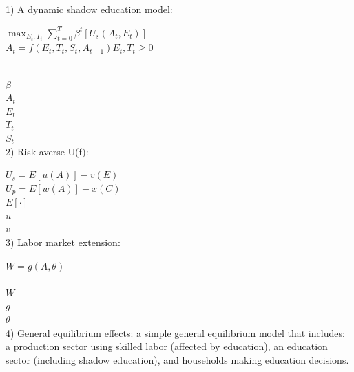 \documentclass[12pt,a4paper,onecolumn]{article}
\numberwithin{equation}{section}
\begin{document}
1) A dynamic shadow education model:

$\max_{E_t, T_t} \sum_{t=0}^{T} \beta^t [U_s(A_t, E_t)]$ \\

$A_t = f(E_t, T_t, S_t, A_{t-1})
E_t, T_t \geq 0$

 \\
$\beta$ \\
$A_t$ \\
$E_t$ \\
$T_t$ \\
$S_t$ \\

2) Risk-averse U(f):

 $U_s = E[u(A)] - v(E)$  \\

 $U_p = E[w(A)] - x(C)$  \\

 $E[\cdot]$  \\
$u$  \\
$v$  \\

3) Labor market extension: 

$W = g(A, \theta)$ \\
 \\
$W$  \\
$g$  \\
$\theta$  \\

4) General equilibrium effects: a simple general equilibrium model that includes: a production sector using skilled labor (affected by education), an education sector (including shadow education), and households making education decisions.


\printbibliography
\end{document}
